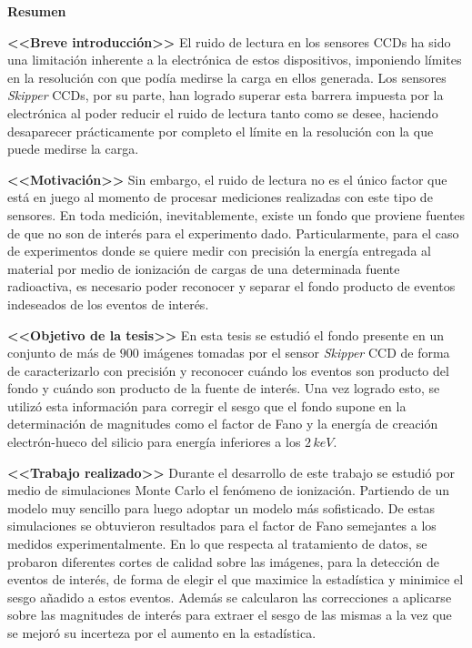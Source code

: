 \newpage
\begin{center}
    {\Large \textbf{Resumen}}
\end{center}
\noindent \textbf{<<Breve introducción>>} El ruido de lectura en los sensores CCDs ha sido una limitación inherente a la electrónica de estos dispositivos, imponiendo límites en la resolución con que podía medirse la carga en ellos generada. Los sensores \textit{Skipper} CCDs, por su parte, han logrado superar esta barrera impuesta por la electrónica al poder reducir el ruido de lectura tanto como se desee, haciendo desaparecer prácticamente por completo el límite en la resolución con la que puede medirse la carga.

\textbf{<<Motivación>>} Sin embargo, el ruido de lectura no es el único factor que está en juego al momento de procesar mediciones realizadas con este tipo de sensores. En toda medición, inevitablemente, existe un fondo que proviene fuentes de que no son de interés para el experimento dado. Particularmente, para el caso de experimentos donde se quiere medir con precisión la energía entregada al material por medio de ionización de cargas de una determinada fuente radioactiva, es necesario poder reconocer y separar el fondo producto de eventos indeseados de los eventos de interés.

\textbf{<<Objetivo de la tesis>>} En esta tesis se estudió el fondo presente en un conjunto de más de $900$ imágenes tomadas por el sensor \textit{Skipper} CCD de forma de caracterizarlo con precisión y reconocer cuándo los eventos son producto del fondo y cuándo son producto de la fuente de interés. Una vez logrado esto, se utilizó esta información para corregir el sesgo que el fondo supone en la determinación de magnitudes como el factor de Fano y la energía de creación electrón-hueco del silicio para energía inferiores a los $2\,\si{keV}$.

\textbf{<<Trabajo realizado>>} Durante el desarrollo de este trabajo se estudió por medio de simulaciones Monte Carlo el fenómeno de ionización. Partiendo de un modelo muy sencillo para luego adoptar un modelo más sofisticado. De estas simulaciones se obtuvieron resultados para el factor de Fano semejantes a los medidos experimentalmente. En lo que respecta al tratamiento de datos, se probaron diferentes cortes de calidad sobre las imágenes, para la detección de eventos de interés, de forma de elegir el que maximice la estadística y minimice el sesgo añadido a estos eventos. Además se calcularon las correcciones a aplicarse sobre las magnitudes de interés para extraer el sesgo de las mismas a la vez que se mejoró su incerteza por el aumento en la estadística.


